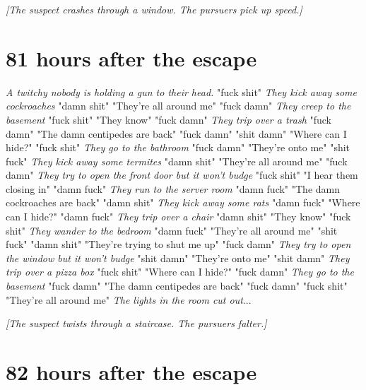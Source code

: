 \documentclass{report}
\begin{document}
\textit{[The suspect crashes through a window. The pursuers pick up speed.]}


\section*{81 \small{hours after the escape}}

\textit{A twitchy nobody is holding a gun to their head.} "fuck shit" \textit{They kick away some cockroaches} "damn shit" "They're all around me" "fuck damn" \textit{They creep to the basement} "fuck shit" "They know" "fuck damn" \textit{They trip over a trash} "fuck damn" "The damn centipedes are back" "fuck damn" \textit{} "shit damn" "Where can I hide?" "fuck shit" \textit{They go to the bathroom} "fuck damn" "They're onto me" "shit fuck" \textit{They kick away some termites} "damn shit" "They're all around me" "fuck damn" \textit{They try to open the front door but it won't budge} "fuck shit" "I hear them closing in" "damn fuck" \textit{They run to the server room} "damn fuck" "The damn cockroaches are back" "damn shit" \textit{They kick away some rats} "damn fuck" "Where can I hide?" "damn fuck" \textit{They trip over a chair} "damn shit" "They know" "fuck shit" \textit{They wander to the bedroom} "damn fuck" "They're all around me" "shit fuck" \textit{} "damn shit" "They're trying to shut me up" "fuck damn" \textit{They try to open the window but it won't budge} "shit damn" "They're onto me" "shit damn" \textit{They trip over a pizza box} "fuck shit" "Where can I hide?" "fuck damn" \textit{They go to the basement} "fuck damn" "The damn centipedes are back" "fuck damn" \textit{} "fuck shit" "They're all around me" \textit{The lights in the room cut out}...

\textit{[The suspect twists through a staircase. The pursuers falter.]}


\section*{82 \small{hours after the escape}}
\end{document}
